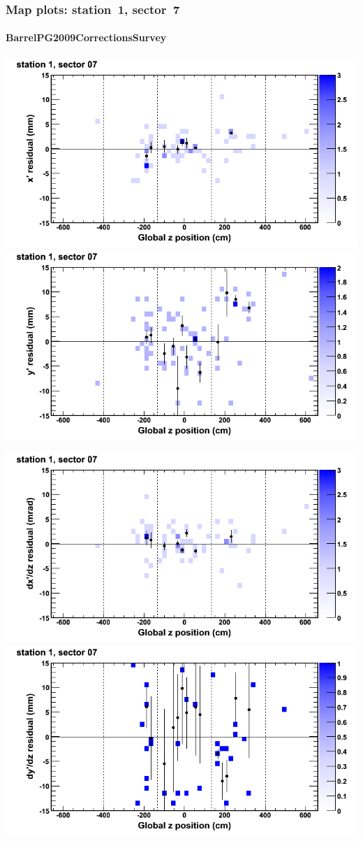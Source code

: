 \documentclass[compress]{beamer}
\begin{document}
\begin{frame}
\frametitle{Map plots: station~1, sector~7}
\framesubtitle{BarrelPG2009CorrectionsSurvey}
\includegraphics[width=0.5\linewidth]{mapplots_01/DTvsz_st1sec07_x.png}
\includegraphics[width=0.5\linewidth]{mapplots_01/DTvsz_st1sec07_y.png}

\includegraphics[width=0.5\linewidth]{mapplots_01/DTvsz_st1sec07_dxdz.png}
\includegraphics[width=0.5\linewidth]{mapplots_01/DTvsz_st1sec07_dydz.png}
\end{frame}
\end{document}
